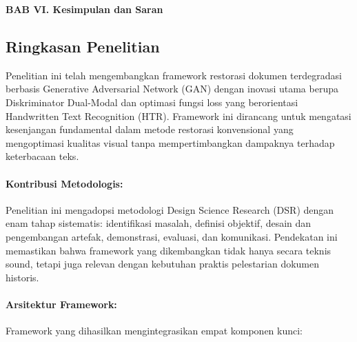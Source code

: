 \documentclass[12pt,a4paper]{article}
\begin{document}

\vspace{2cm}
\begin{center}
{\fontsize{14}{16.8}\selectfont\textbf{BAB VI. Kesimpulan dan Saran}}\\[1em]
\end{center}
\label{sec:kesimpulan-saran}
\setcounter{section}{6}
\setcounter{subsection}{0}
\vspace{2em}

\subsection{Ringkasan Penelitian}
\label{subsec:ringkasan}
\vspace{0.8em}

Penelitian ini telah mengembangkan framework restorasi dokumen terdegradasi berbasis Generative Adversarial Network (GAN) dengan inovasi utama berupa Diskriminator Dual-Modal dan optimasi fungsi loss yang berorientasi Handwritten Text Recognition (HTR). Framework ini dirancang untuk mengatasi kesenjangan fundamental dalam metode restorasi konvensional yang mengoptimasi kualitas visual tanpa mempertimbangkan dampaknya terhadap keterbacaan teks.

\paragraph{Kontribusi Metodologis:}

Penelitian ini mengadopsi metodologi Design Science Research (DSR) dengan enam tahap sistematis: identifikasi masalah, definisi objektif, desain dan pengembangan artefak, demonstrasi, evaluasi, dan komunikasi. Pendekatan ini memastikan bahwa framework yang dikembangkan tidak hanya secara teknis sound, tetapi juga relevan dengan kebutuhan praktis pelestarian dokumen historis.

\paragraph{Arsitektur Framework:}

Framework yang dihasilkan mengintegrasikan empat komponen kunci:
\end{document}
